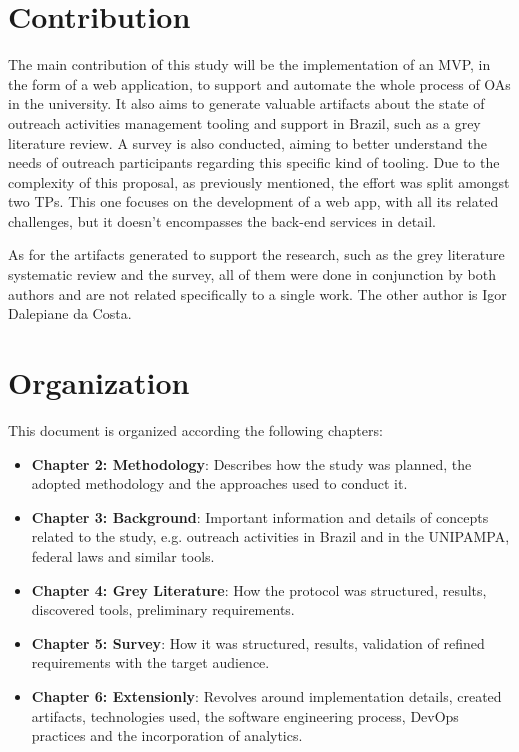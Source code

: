 \section{Contribution}\label{sec:contribution}

The main contribution of this study will be the implementation of an \ac{MVP}, in the form of a web application, to support and automate the whole process of \acp{OA} in the university. It also aims to generate valuable artifacts about the state of outreach activities management tooling and support in Brazil, such as a grey literature review. A survey is also conducted, aiming to better understand the needs of outreach participants regarding this specific kind of tooling. Due to the complexity of this proposal, as previously mentioned, the effort was split amongst two \acp{TP}. This one focuses on the development of a web app, with all its related challenges, but it doesn't encompasses the back-end services in detail.

As for the artifacts generated to support the research, such as the grey literature systematic review and the survey, all of them were done in conjunction by both authors and are not related specifically to a single work. The other author is Igor Dalepiane da Costa.

\section{Organization}\label{sec:organization}

This document is organized according the following chapters:

\begin{itemize}
  \item \textbf{Chapter 2: Methodology}: Describes how the study was planned, the adopted methodology and the approaches used to conduct it.
  \item \textbf{Chapter 3: Background}: Important information and details of concepts related to the study, e.g. outreach activities in Brazil and in the \acl{UNIPAMPA}, federal laws and similar tools.
  \item \textbf{Chapter 4: Grey Literature}: How the protocol was structured, results, discovered tools, preliminary requirements.
  \item \textbf{Chapter 5: Survey}: How it was structured, results, validation of refined requirements with the target audience.
  \item \textbf{Chapter 6: Extensionly}: Revolves around implementation details, created artifacts, technologies used, the software engineering process, DevOps practices and the incorporation of analytics.
\end{itemize}
